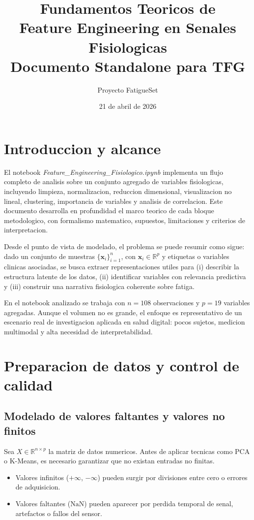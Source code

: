 \documentclass[12pt,a4paper,oneside]{report}
\title{\Huge Fundamentos Teoricos de\\Feature Engineering en Senales Fisiologicas\\[0.6cm]
\Large Documento Standalone para TFG}
\author{Proyecto FatigueSet}
\date{21 de abril de 2026}
\begin{document}
\maketitle
\tableofcontents
\newpage

\chapter{Introduccion y alcance}

El notebook \textit{Feature\_Engineering\_Fisiologico.ipynb} implementa un flujo completo de analisis sobre un conjunto agregado de variables fisiologicas, incluyendo limpieza, normalizacion, reduccion dimensional, visualizacion no lineal, clustering, importancia de variables y analisis de correlacion. Este documento desarrolla en profundidad el marco teorico de cada bloque metodologico, con formalismo matematico, supuestos, limitaciones y criterios de interpretacion.

Desde el punto de vista de modelado, el problema se puede resumir como sigue: dado un conjunto de muestras $\{\mathbf{x}_i\}_{i=1}^{n}$, con $\mathbf{x}_i \in \mathbb{R}^{p}$ y etiquetas o variables clinicas asociadas, se busca extraer representaciones utiles para (i) describir la estructura latente de los datos, (ii) identificar variables con relevancia predictiva y (iii) construir una narrativa fisiologica coherente sobre fatiga.

En el notebook analizado se trabaja con $n=108$ observaciones y $p=19$ variables agregadas. Aunque el volumen no es grande, el enfoque es representativo de un escenario real de investigacion aplicada en salud digital: pocos sujetos, medicion multimodal y alta necesidad de interpretabilidad.

\chapter{Preparacion de datos y control de calidad}

\section{Modelado de valores faltantes y valores no finitos}

Sea $X \in \mathbb{R}^{n \times p}$ la matriz de datos numericos. Antes de aplicar tecnicas como PCA o K-Means, es necesario garantizar que no existan entradas no finitas.

\begin{itemize}
\item Valores infinitos ($+\infty$, $-\infty$) pueden surgir por divisiones entre cero o errores de adquisicion.
\item Valores faltantes ($\mathrm{NaN}$) pueden aparecer por perdida temporal de senal, artefactos o fallos del sensor.
\end{itemize}
\end{document}

